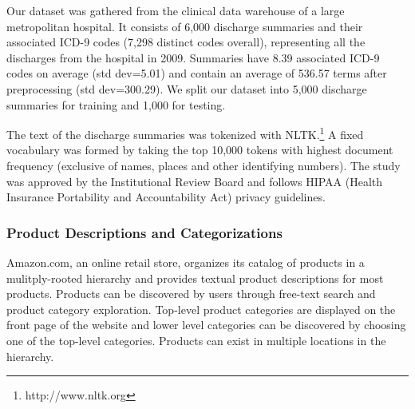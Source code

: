 
Our dataset was gathered from the clinical data warehouse of
a large metropolitan hospital. It consists of 6,000 discharge summaries and
their associated ICD-9 codes (7,298 distinct codes overall), representing all
the discharges from the hospital in 2009. Summaries have 8.39 associated ICD-9
codes on average (std dev=5.01) and contain an average of 536.57 terms after
preprocessing (std dev=300.29). We split our dataset into 5,000 discharge
summaries for training and 1,000 for testing.

The text of the discharge summaries was tokenized with
NLTK.\footnote{http://www.nltk.org} A fixed vocabulary was formed by taking
the top 10,000 tokens with highest document frequency (exclusive of names,
places and other identifying numbers). The study was approved
by the Institutional Review Board and follows HIPAA (Health
Insurance Portability and Accountability Act) privacy guidelines.


\subsubsection{Product Descriptions and Categorizations}

Amazon.com, an online retail store, organizes its catalog of products in a
mulitply-rooted hierarchy and provides textual product descriptions 
for most products. Products can be discovered by users
through free-text search and product category exploration. Top-level
product categories are displayed on the front page of the website and lower
level categories can be discovered by choosing one of the top-level categories.
Products can exist in multiple locations in the hierarchy.


